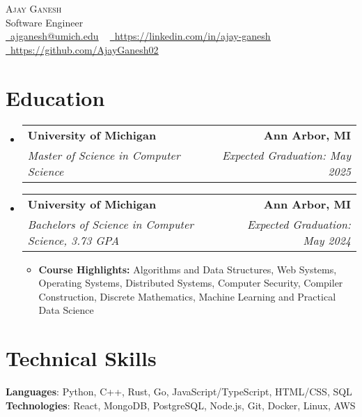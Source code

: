 \documentclass[letterpaper,11pt]{article}
\makeatletter
\newcommand{\resumeItem}[1]{
  \item\small{
    {#1 \vspace{-3pt}}
  }
}
\newcommand{\resumeSubheading}[4]{
  \vspace{-3pt}\item
    \begin{tabular*}{1.0\textwidth}[t]{l@{\extracolsep{\fill}}r}
      \textbf{#1} & \textbf{\small #2} \\
      \textit{\small#3} & \textit{\small #4} \\
    \end{tabular*}\vspace{-7pt}
}
\newcommand{\resumeSubHeadingListStart}{\begin{itemize}[leftmargin=0.0in, label={}]}
\newcommand{\resumeSubHeadingListEnd}{\end{itemize}}
\newcommand{\resumeItemListStart}{\begin{itemize}}
\newcommand{\resumeItemListEnd}{\end{itemize}\vspace{0pt}}
\makeatother
\begin{document}
\begin{center}
  {\Huge\scshape Ajay Ganesh}
  \\ Software Engineer\\
  \small
  \href{mailto:ajganesh@umich.edu}{\raisebox{-0.2\height}\faEnvelope\  \underline{ajganesh@umich.edu}} ~
  \href{https://www.linkedin.com/in/ajay-ganesh/}{\raisebox{-0.2\height}\faLinkedin\ \underline{https://linkedin.com/in/ajay-ganesh}}  ~
  \href{https://github.com/AjayGanesh02}{\raisebox{-0.2\height}\faGithub\ \underline{https://github.com/AjayGanesh02}}
\end{center}

\section{Education}
\resumeSubHeadingListStart

\resumeSubheading
{University of Michigan}{Ann Arbor, MI}
{Master of Science in Computer Science}{Expected Graduation: May 2025}

\resumeSubheading
{University of Michigan}{Ann Arbor, MI}
{Bachelors of Science in Computer Science, 3.73 GPA}{Expected Graduation: May 2024}
\resumeItemListStart
\resumeItem{\textbf{Course Highlights:} Algorithms and Data Structures, Web Systems, Operating Systems, Distributed Systems, Computer Security, Compiler Construction, Discrete Mathematics, Machine Learning and Practical Data Science}
\resumeItemListEnd

\resumeSubHeadingListEnd

\section{Technical Skills}

\vspace{-7pt}
\begin{itemize}
  [leftmargin=0.15in, label={}]\small{\item{
        \textbf{Languages}{: Python, C++, Rust, Go, JavaScript/TypeScript, HTML/CSS, SQL} \\
        \textbf{Technologies}{: React, MongoDB, PostgreSQL, Node.js, Git, Docker, Linux, AWS} \\}}
\end{itemize}
\end{document}
